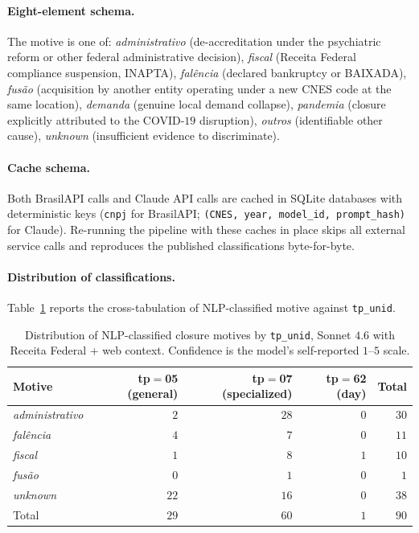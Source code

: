 \paragraph{Eight-element schema.} The motive is one of:
\emph{administrativo} (de-accreditation under the psychiatric reform
or other federal administrative decision), \emph{fiscal} (Receita
Federal compliance suspension, INAPTA), \emph{fal\^encia} (declared
bankruptcy or BAIXADA), \emph{fus\~ao} (acquisition by another entity
operating under a new CNES code at the same location),
\emph{demanda} (genuine local demand collapse), \emph{pandemia}
(closure explicitly attributed to the COVID-$19$ disruption),
\emph{outros} (identifiable other cause), \emph{unknown} (insufficient
evidence to discriminate).

\paragraph{Cache schema.} Both BrasilAPI calls and Claude API calls
are cached in SQLite databases with deterministic keys
(\texttt{cnpj} for BrasilAPI; \texttt{(CNES, year, model\_id, prompt\_hash)}
for Claude). Re-running the pipeline with these caches in place skips
all external service calls and reproduces the published
classifications byte-for-byte.

\paragraph{Distribution of classifications.}
Table~\ref{tab:nlp-distribution} reports the cross-tabulation of
NLP-classified motive against \texttt{tp\_unid}.

\begin{table}[h!]
\centering
\caption{Distribution of NLP-classified closure motives by
\texttt{tp\_unid}, Sonnet $4.6$ with Receita Federal + web context.
Confidence is the model's self-reported $1$--$5$ scale.}
\label{tab:nlp-distribution}
\small
\begin{tabular}{lrrrr}
\toprule
Motive & tp$=$05 (general) & tp$=$07 (specialized) & tp$=$62 (day) & Total \\
\midrule
\emph{administrativo}     & $2$  & $28$ & $0$ & $30$ \\
\emph{fal\^encia}         & $4$  & $7$  & $0$ & $11$ \\
\emph{fiscal}             & $1$  & $8$  & $1$ & $10$ \\
\emph{fus\~ao}            & $0$  & $1$  & $0$ & $1$  \\
\emph{unknown}            & $22$ & $16$ & $0$ & $38$ \\
\midrule
Total                     & $29$ & $60$ & $1$ & $90$ \\
\bottomrule
\end{tabular}
\end{table}

